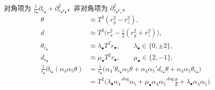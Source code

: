 对角项为 $\frac{1}{r_\bullet}\partial_{r_\bullet}+\partial^2_{r_\bullet r_\bullet}$，非对角项为 $\partial^2_{r_\bullet r_\star}$。
\begin{align*}
\theta&\approx T^2(r_y^2-r_z^2),\\
d&\approx T^2\big(r_x^2-\tfrac12(r_y^2+r_z^2)\big),\\
\theta_{r_\bullet}&\approx\lambda_\bullet T^2r_\bullet,\qquad\lambda_\bullet\in\{0,\pm2\},\\
d_{r_\bullet}&\approx\mu_\bullet T^2r_\bullet,\qquad\mu_\bullet\in\{2,-1\},\\
\frac{1}{r_\bullet}\partial_{r_\bullet}(\alpha_4\alpha_5\theta)
&=\frac{1}{r_\bullet}\big(\alpha_4'\theta_{r_\bullet}\alpha_5\theta+\alpha_4\alpha_5'd_{r_\bullet}\theta+\alpha_4\alpha_5\theta_{r_\bullet}\big)\\
&=T^2\Big(\lambda_\bullet{\alpha_4'}^{\log}\alpha_5+\mu_\bullet\alpha_4{\alpha_5'}^{\log}\frac{\theta}{d}+\lambda_\bullet\alpha_4\alpha_5\Big).
\end{align*}

